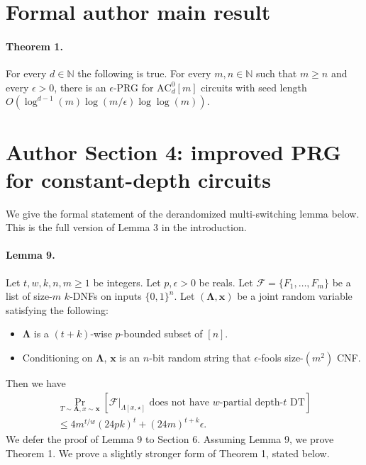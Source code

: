 \documentclass[10pt,a4paper]{article}
\begin{document}
\section*{Formal author main result}
\paragraph{Theorem 1.} For every $d\in\mathbb N$ the following is true. For every $m,n\in\mathbb N$ such that $m\ge n$ and every $\epsilon>0$, there is an $\epsilon$-PRG for $\mathrm{AC}^0_d[m]$ circuits with seed length $O(\log^{d-1}(m)\log(m/\epsilon)\log\log(m))$.

\section*{Author Section 4: improved PRG for constant-depth circuits}
We give the formal statement of the derandomized multi-switching lemma below. This is the full version of Lemma 3 in the introduction.
\paragraph{Lemma 9.} Let $t,w,k,n,m\ge1$ be integers. Let $p,\epsilon>0$ be reals. Let $\mathcal F=\{F_1,\ldots,F_m\}$ be a list of size-$m$ $k$-DNFs on inputs $\{0,1\}^n$. Let $(\boldsymbol\Lambda,\boldsymbol x)$ be a joint random variable satisfying the following:
\begin{itemize}\item $\boldsymbol\Lambda$ is a $(t+k)$-wise $p$-bounded subset of $[n]$.
\item Conditioning on $\boldsymbol\Lambda$, $\boldsymbol x$ is an $n$-bit random string that $\epsilon$-fools size-$(m^2)$ CNF.\end{itemize}
Then we have
\begin{multline*}\Pr_{T\sim\boldsymbol\Lambda,x\sim\boldsymbol x}[\mathcal F|_{\Lambda[x,\star]}\text{ does not have }w\text{-partial depth-}t\text{ DT}]\\\le4m^{t/w}(24pk)^t+(24m)^{t+k}\epsilon.\end{multline*}
We defer the proof of Lemma 9 to Section 6. Assuming Lemma 9, we prove Theorem 1. We prove a slightly stronger form of Theorem 1, stated below.
\end{document}
